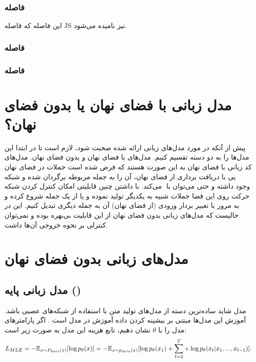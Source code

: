 \subsubsection{فاصله }
این فاصله که فاصله JS نیز نامیده می‌شود.
\subsubsection{فاصله }
\subsubsection{فاصله }
\section{مدل زبانی با فضای نهان یا بدون فضای نهان؟}
پیش از آنکه در مورد مدل‌های زبانی ارائه شده صحبت شود، لازم است تا در ابتدا این مدل‌ها را به دو دسته تقسیم کنیم. مدل‌های با فضای نهان و بدون فضای نهان. مدل‌های زبانی با فضای نهان به این صورت هستند که فرض شده است جملات در فضای نهان ‎کد شده و شبکه ‎\decoder یی با دریافت برداری از فضای نهان، آن را به جمله مربوطه برگردان می‌کند. با داشتن چنین قابلیتی امکان کنترل کردن شبکه ‎\decoder{}‎ وجود داشته و حتی می‌توان با حرکت روی این فضا جملات شبیه به یکدیگر تولید نموده و یا از یک جمله شروع کرده و به مرور با تغییر بردار ورودی (از فضای نهان) آن به جمله دیگری تبدیل کنیم. این در حالیست که مدل‌های زبانی بدون فضای نهان از این قابلیت بی‌بهره بوده و نمی‌توان کنترلی بر نحوه خروجی آن‌ها داشت.
\section{مدل‌های زبانی بدون فضای نهان}
\subsection{مدل زبانی پایه (\teacherforcing{})}
مدل  شاید ساده‌ترین دسته از مدل‌های تولید متن با استفاده از شبکه‌های عصبی باشد. آموزش این مدل‌ها مبتنی بر بیشینه کردن  داده آموزش در مدل است \cite{teacher-force}. اگر پارامترهای مدل را با $‎\theta$ نشان دهیم، تابع هزینه این مدل به صورت زیر است:
\begin{equation}\begin{split}
		L_{MLE} = -\mathbb E_{x \sim P_{data}(x)} [\log p_\theta (x)] = -\mathbb E_{x \sim p_{data}(x)} [\log p_\theta (x_1) + \sum_{t=2}^{T}  +\log p_\theta (x_t|x_1, ..., x_{t-1})].
	\end{split}\end{equation}

